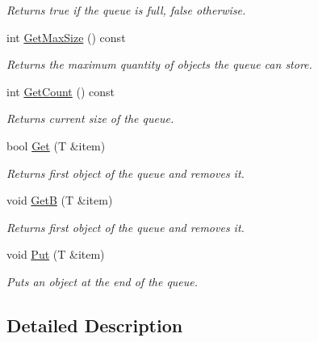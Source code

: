 \begin{DoxyCompactItemize}
\begin{DoxyCompactList}\small\item\em Returns true if the queue is full, false otherwise. \end{DoxyCompactList}\item 
\hypertarget{class_common_1_1_queue_a91687a9f762db2438ab1bb20b9f8cbc7}{int \hyperlink{class_common_1_1_queue_a91687a9f762db2438ab1bb20b9f8cbc7}{Get\-Max\-Size} () const }\label{class_common_1_1_queue_a91687a9f762db2438ab1bb20b9f8cbc7}

\begin{DoxyCompactList}\small\item\em Returns the maximum quantity of objects the queue can store. \end{DoxyCompactList}\item 
\hypertarget{class_common_1_1_queue_af4de096689b19a9a981f346b481f10b4}{int \hyperlink{class_common_1_1_queue_af4de096689b19a9a981f346b481f10b4}{Get\-Count} () const }\label{class_common_1_1_queue_af4de096689b19a9a981f346b481f10b4}

\begin{DoxyCompactList}\small\item\em Returns current size of the queue. \end{DoxyCompactList}\item 
bool \hyperlink{class_common_1_1_queue_a6e413c69288723a3be1988a281b1376d}{Get} (T \&item)
\begin{DoxyCompactList}\small\item\em Returns first object of the queue and removes it. \end{DoxyCompactList}\item 
void \hyperlink{class_common_1_1_queue_ab2d57ae853e4c7134c9c68e349e88bbb}{Get\-B} (T \&item)
\begin{DoxyCompactList}\small\item\em Returns first object of the queue and removes it. \end{DoxyCompactList}\item 
void \hyperlink{class_common_1_1_queue_a1beaac66f3ae562a726171f020aeb655}{Put} (T \&item)
\begin{DoxyCompactList}\small\item\em Puts an object at the end of the queue. \end{DoxyCompactList}\end{DoxyCompactItemize}


\subsection{Detailed Description}
